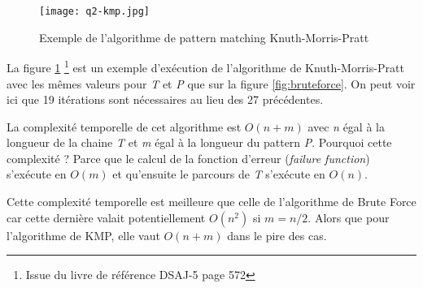 \begin{figure}[h]
	\centering
	\texttt{[image: q2-kmp.jpg]}
	\caption{Exemple de l'algorithme de pattern matching Knuth-Morris-Pratt}
	\label{fig:kmp}
\end{figure}

La figure \ref{fig:kmp}  \footnote{Issue du livre de référence DSAJ-5 page 572} est un exemple d'exécution de l'algorithme de Knuth-Morris-Pratt avec les mêmes valeurs pour \textit{T} et \textit{P} que sur la figure \ref{fig:bruteforce}. On peut voir ici que 19 itérations sont nécessaires au lieu des 27 précédentes.

La complexité temporelle de cet algorithme est $O(n+m)$ avec \textit{n} égal à la longueur de la chaine \textit{T} et \textit{m} égal à la longueur du pattern \textit{P}.
Pourquoi cette complexité ? Parce que le calcul de la fonction d'erreur (\textit{failure function}) s'exécute en $O(m)$ et qu'ensuite le parcours de \textit{T} s'exécute en $O(n)$.

Cette complexité temporelle est meilleure que celle de l'algorithme de Brute Force car cette dernière valait potentiellement $O(n^2)$ si $m = n/2$. Alors que pour l'algorithme de KMP, elle vaut $O(n+m)$ dans le pire des cas.
